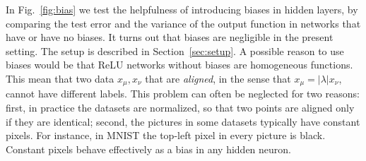 \documentclass{article}
\newcommand{\sref}[1]{Section~\ref{#1}}
\newcommand{\fref}[1]{Fig.~\ref{#1}}
\begin{document}
In \fref{fig:bias} we test the helpfulness of introducing biases in hidden layers, by comparing the test error and the variance of the output function in networks that have or have no biases. It turns out that biases are negligible in the present setting. The setup is described in \sref{sec:setup}. A possible reason to use biases would be that ReLU networks without biases are homogeneous functions. This mean that two data $x_\mu, x_\nu$ that are \emph{aligned}, in the sense that $x_\mu = |\lambda| x_\nu$, cannot have different labels. This problem can often be neglected for two reasons: first, in practice the datasets are normalized, so that two points are aligned only if they are identical; second, the pictures in some datasets typically have constant pixels. For instance, in MNIST the top-left pixel in every picture is black. Constant pixels behave effectively as a bias in any hidden neuron.
\end{document}
